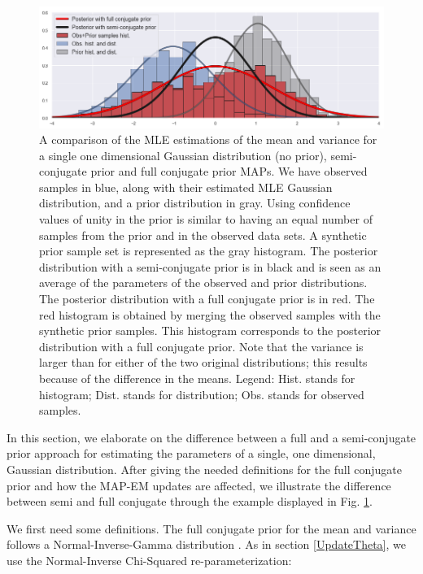 \documentclass[extra]{gji} %
\begin{document}
\begin{figure}
    \includegraphics[width=\textwidth]{./Fig/LowRes/Full_vs_Semi_conjugate.png}
    \caption{A comparison of the MLE estimations of the mean and variance for a single one dimensional Gaussian distribution (no prior), semi-conjugate prior and full conjugate prior MAPs. We have observed samples in blue, along with their estimated MLE Gaussian distribution, and a prior distribution in gray. Using confidence values of unity in the prior is similar to having an equal number of samples from the prior and in the observed data sets. A synthetic prior sample set is represented as the gray histogram. The posterior distribution with a semi-conjugate prior is in black and is seen as an average of the parameters of the observed and prior distributions. The posterior distribution with a full conjugate prior is in red. The red histogram is obtained by merging the observed samples with the synthetic prior samples. This histogram corresponds to the posterior distribution with a full conjugate prior. Note that the variance is larger than for either of the two original distributions; this results because of  the difference in the means. Legend: Hist. stands for histogram; Dist. stands for distribution; Obs. stands for observed samples.}
    \label{Full_vs_Semi_conjugate}
\end{figure}

In this section, we elaborate on the difference between a full and a semi-conjugate prior approach for estimating the parameters of a single, one dimensional, Gaussian distribution. After giving the needed definitions for the full conjugate prior and how the MAP-EM updates are affected, we illustrate the difference between semi and full conjugate through the example displayed in Fig. \ref{Full_vs_Semi_conjugate}.

We first need some definitions. The full conjugate prior for the mean and variance follows a Normal-Inverse-Gamma distribution \citep{Murphy:2012:MLP:2380985}. As in section \ref{UpdateTheta}, we use the Normal-Inverse Chi-Squared re-parameterization:
\end{document}

